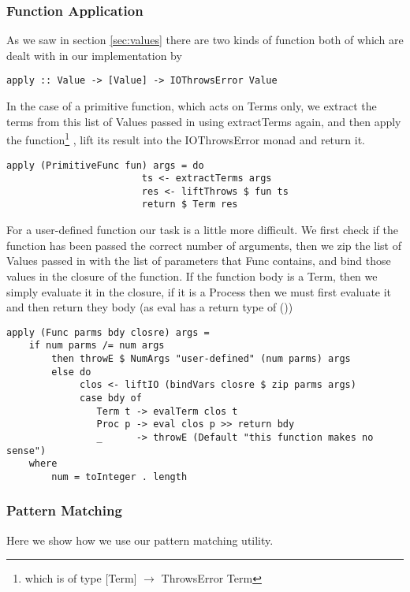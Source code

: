 \subsubsection{Function Application}

As we saw in section \ref{sec:values} there are two kinds of function both of which are dealt with in our implementation by
\begin{verbatim}
apply :: Value -> [Value] -> IOThrowsError Value 
\end{verbatim}

In the case of a primitive function, which acts on Terms only, we extract the terms from this list of Values passed in using extractTerms again, and then apply the function\footnote{which is of type $[$Term$]$ $\rightarrow$ ThrowsError Term} , lift its result into the IOThrowsError monad and return it.
\begin{verbatim}
apply (PrimitiveFunc fun) args = do
                        ts <- extractTerms args
                        res <- liftThrows $ fun ts
                        return $ Term res
\end{verbatim}

For a user-defined function our task is a little more difficult. We first check if the function has been passed the correct number of arguments, then we zip the list of Values passed in with the list of parameters that Func contains, and bind those values in the closure of the function. If the function body is a Term, then we simply evaluate it in the closure, if it is a Process then we must first evaluate it and then return they body (as eval has a return type of ()) 
\begin{verbatim}
apply (Func parms bdy closre) args =
    if num parms /= num args 
        then throwE $ NumArgs "user-defined" (num parms) args
        else do
             clos <- liftIO (bindVars closre $ zip parms args)
             case bdy of
                Term t -> evalTerm clos t
                Proc p -> eval clos p >> return bdy
                _      -> throwE (Default "this function makes no sense")
    where
        num = toInteger . length
\end{verbatim}

\subsubsection{Pattern Matching}
\label{sec:letpatterns}

Here we show how we use our pattern matching utility.

